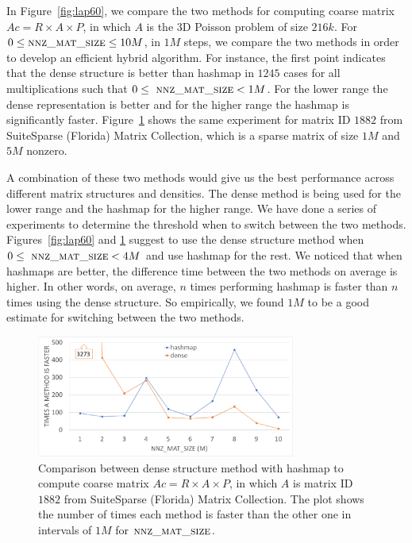 In Figure~\ref{fig:lap60}, we compare the two methods for computing coarse matrix $Ac = R \times A \times P$, in which $A$ is the 3D Poisson problem of size $216k$. For $0 \leq \textsc{nnz\_mat\_size} \leq 10M$, in $1M$ steps, we compare the two methods in order to develop an efficient hybrid algorithm. For instance, the first point indicates that the dense structure is better than hashmap in $1245$ cases for all multiplications such that $0 \le\ \textsc{nnz\_mat\_size} < 1M$. For the lower range the dense representation is better and for the higher range the hashmap is significantly faster. Figure~\ref{fig:eco} shows the same experiment for matrix ID $1882$ from SuiteSparse (Florida) Matrix Collection, which is a sparse matrix of size $1M$ and $5M$ nonzero.

A combination of these two methods would give us the best performance across different matrix structures and densities. The dense method is being used for the lower range and the hashmap for the higher range.
We have done a series of experiments to determine the threshold when to switch between the two methods. Figures~\ref{fig:lap60} and \ref{fig:eco} suggest to use the dense structure method when $0 \le\ \textsc{nnz\_mat\_size} < 4M$ and use hashmap for the rest. We noticed that when hashmaps are better, the difference time between the two methods on average is higher. In other words, on average, $n$ times performing hashmap is faster than $n$ times using the dense structure. So empirically, we found $1M$ to be a good estimate for switching between the two methods.

\begin{figure}[tbh]
 \centering
 \includegraphics[width=8.5cm,height=4cm]{./figures/eco_range.pdf}
 \caption{Comparison between dense structure method with hashmap to compute coarse matrix $Ac = R \times A \times P$, in which $A$ is matrix ID $1882$ from SuiteSparse (Florida) Matrix Collection. The plot shows the number of times each method is faster than the other one in intervals of $1M$ for $\textsc{nnz\_mat\_size}$.}
 \label{fig:eco}
\end{figure}

